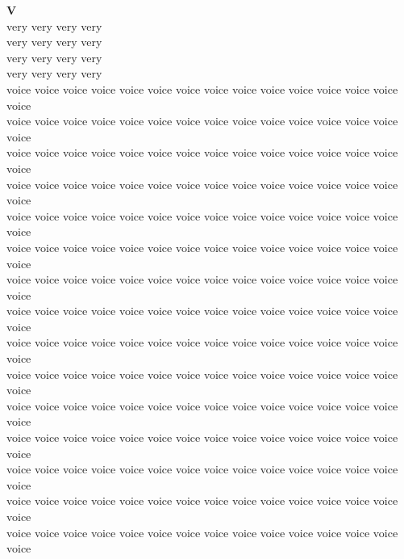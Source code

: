 \vspace{14pt}
\noindent\textbf{\Large V}\\[+12pt]
very very very very\\
very very very very\\
very very very very\\
very very very very\\
voice voice voice voice voice voice voice voice voice voice voice voice voice voice voice\\
voice voice voice voice voice voice voice voice voice voice voice voice voice voice voice\\
voice voice voice voice voice voice voice voice voice voice voice voice voice voice voice\\
voice voice voice voice voice voice voice voice voice voice voice voice voice voice voice\\
voice voice voice voice voice voice voice voice voice voice voice voice voice voice voice\\
voice voice voice voice voice voice voice voice voice voice voice voice voice voice voice\\
voice voice voice voice voice voice voice voice voice voice voice voice voice voice voice\\
voice voice voice voice voice voice voice voice voice voice voice voice voice voice voice\\
voice voice voice voice voice voice voice voice voice voice voice voice voice voice voice\\
voice voice voice voice voice voice voice voice voice voice voice voice voice voice voice\\
voice voice voice voice voice voice voice voice voice voice voice voice voice voice voice\\
voice voice voice voice voice voice voice voice voice voice voice voice voice voice voice\\
voice voice voice voice voice voice voice voice voice voice voice voice voice voice voice\\
voice voice voice voice voice voice voice voice voice voice voice voice voice voice voice\\
voice voice voice voice voice voice voice voice voice voice voice voice voice voice voice\\


